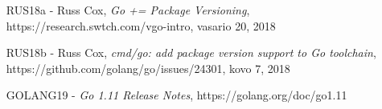 
\begin{itemize}
    \item [RUS18a] - Russ Cox, \emph{Go += Package Versioning}, https://research.swtch.com/vgo-intro, vasario 20, 2018
    \item [RUS18b] - Russ Cox, \emph{cmd/go: add package version support to Go toolchain}, https://github.com/golang/go/issues/24301, kovo 7, 2018
    \item [GOLANG19] - \emph{Go 1.11 Release Notes}, https://golang.org/doc/go1.11
\end{itemize}